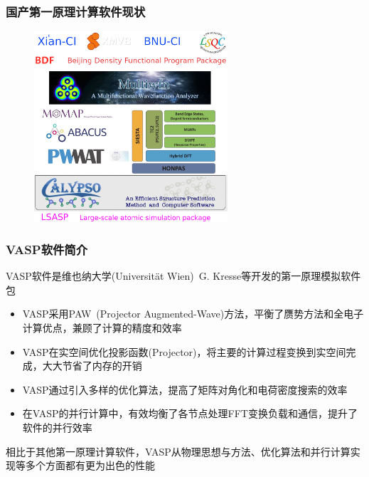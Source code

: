 \frame
{
	\frametitle{国产第一原理计算软件现状}
\begin{figure}[h!]
\vspace*{-0.19in}
\centering
\includegraphics[width=2.83in]{Figures/Softwares_China-logo.png}
\label{Software-China}
\end{figure}
	\fontsize{6.2pt}{5.2pt}\selectfont{\textcolor{red}{中国学科发展战略\,$\cdot$\,理论与计算化学,~~国家自然科学基金委员会,~中国科学院,~~北京:~科学出版社,~~2016}}
}

\frame
{
	\frametitle{\textrm{VASP}软件简介}
	\textrm{VASP}软件是维也纳大学\textrm{(Universit\"at Wien)}~\textrm{G. Kresse}等开发的第一原理模拟软件包
	\begin{itemize}
		\item \textrm{VASP}采用\textrm{PAW~(Projector Augmented-Wave)}方法，平衡了赝势方法和全电子计算优点，兼顾了计算的精度和效率
		\item \textrm{VASP}在实空间优化投影函数\textrm{(Projector)}，将主要的计算过程变换到实空间完成，大大节省了内存的开销%
		\item \textrm{VASP}通过引入多样的优化算法，提高了矩阵对角化和电荷密度搜索的效率%
		\item 在\textrm{VASP}的并行计算中，有效均衡了各节点处理\textrm{FFT}变换负载和通信，提升了软件的并行效率
	\end{itemize}
	相比于其他第一原理计算软件，\textrm{VASP}从物理思想与方法、优化算法和并行计算实现等多个方面都有更为出色的性能%
}

